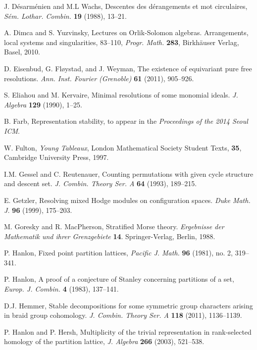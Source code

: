 \documentclass[12pt]{amsart}
\theoremstyle{plain}
\theoremstyle{definition}
\begin{document}
\begin{thebibliography}{99}
J. D\'esarm\'enien and M.L Wachs,
Descentes des d\'erangements et mot circulaires,
{\it S\'em. Lothar. Combin.} {\bf 19} (1988), 13--21.

A. Dimca and S.  Yuzvinsky, 
Lectures on Orlik-Solomon algebras. 
Arrangements, local systems and singularities, 83--110,
{\it Progr. Math.} {\bf 283}, Birkh\"auser Verlag, Basel, 2010.

D. Eisenbud, G. Fl{\o}ystad, and J. Weyman, 
The existence of equivariant pure free resolutions. 
{\it Ann. Inst. Fourier (Grenoble)} {\bf 61} (2011), 905--926. 

S. Eliahou and M. Kervaire, 
Minimal resolutions of some monomial ideals.
{\it J. Algebra}  {\bf 129} (1990), 1--25. 

B. Farb, 
Representation stability, to appear in the {\it Proceedings of the 2014 Seoul ICM}.

W. Fulton, \textit{Young Tableaux},  London Mathematical Society Student Texts, {\bf 35},  Cambridge University Press, 1997.

I.M. Gessel and C. Reutenauer, 
Counting permutations with given cycle structure and descent set. 
{\it J. Combin. Theory Ser. A} {\bf 64} (1993), 189--215. 

E. Getzler, 
Resolving mixed Hodge modules on configuration spaces.
{\it Duke Math. J.} {\bf 96} (1999), 175--203.

M. Goresky and R. MacPherson, 
Stratified Morse theory.
{\it Ergebnisse der Mathematik und ihrer Grenzgebiete}
{\bf 14}. Springer-Verlag, Berlin, 1988.
 
 P. Hanlon, Fixed point partition lattices, {\it Pacific J. Math.} {\bf 96} (1981), no. 2, 319--341.

 P. Hanlon, A proof of a conjecture of Stanley concerning partitions of a  set, {\it Europ. J. Combin.} {\bf 4}  (1983), 137--141.

D.J. Hemmer, 
Stable decompositions for some 
symmetric group characters arising in braid group cohomology.
{\it J. Combin. Theory Ser. A} {\bf 118} (2011), 1136--1139. 

 P. Hanlon and P. Hersh, Multiplicity of the trivial representation in rank-selected homology of the partition lattice, {\it J. Algebra} {\bf 266} (2003), 521--538.


\end{thebibliography}
\end{document}
